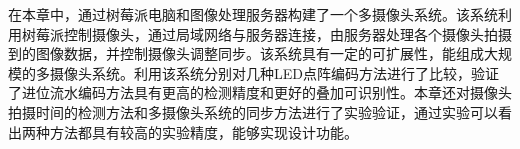 在本章中，通过树莓派电脑和图像处理服务器构建了一个多摄像头系统。该系统利用树莓派控制摄像头，通过局域网络与服务器连接，由服务器处理各个摄像头拍摄到的图像数据，并控制摄像头调整同步。该系统具有一定的可扩展性，能组成大规模的多摄像头系统。利用该系统分别对几种LED点阵编码方法进行了比较，验证了进位流水编码方法具有更高的检测精度和更好的叠加可识别性。本章还对摄像头拍摄时间的检测方法和多摄像头系统的同步方法进行了实验验证，通过实验可以看出两种方法都具有较高的实验精度，能够实现设计功能。



























































